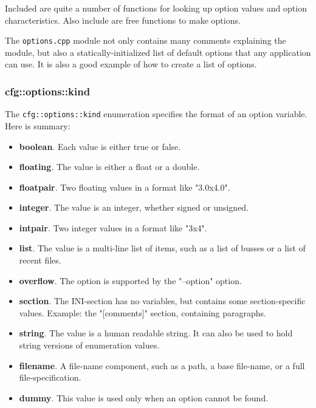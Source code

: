    Included are quite a number of functions for looking up option values
   and option characteristics.
   Also include are free functions to make options.

   The \texttt{options.cpp} module not only contains many comments explaining
   the module, but also a statically-initialized list of
   default options that any application can use.
   It is also a good example of how to create a list of options.

\subsubsection{cfg::options::kind}
\label{subsubsec:cfg_namespace_options_kind}

   The \texttt{cfg::options::kind} enumeration specifies the format of
   an option variable.
   Here is summary:


   \begin{itemize}
       \item \textbf{boolean}. Each value is either true or false.
       \item \textbf{floating}. The value is either a float or a double.
       \item \textbf{floatpair}. Two floating values in a format like "3.0x4.0".
       \item \textbf{integer}. The value is an integer, whether signed or
           unsigned.
       \item \textbf{intpair}. Two integer values in a format like "3x4".
       \item \textbf{list}. The value is a multi-line list of items, such as
           a list of busses or a list of recent files.
       \item \textbf{overflow}. The option is supported by the "--option"
           option.
       \item \textbf{section}. The INI-section has no variables, but contains
           some section-specific values.  Example: the "[comments]"
           section, containing paragraphs.
       \item \textbf{string}.  The value is a human readable string. It can also
           be used to hold string versions of enumeration values.
       \item \textbf{filename}. A file-name component, such as a path, a base
           file-name, or a full file-specification.
       \item \textbf{dummy}. This value is used only when an option cannot
            be found.
   \end{itemize}

